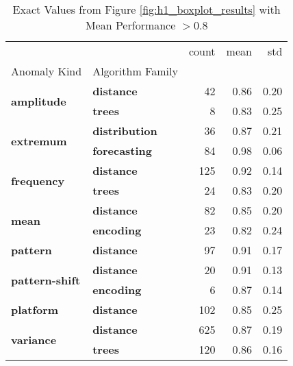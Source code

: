 \begin{table}
\centering
\caption{Exact Values from Figure \ref{fig:h1_boxplot_results} with Mean Performance $> 0.8$}
\label{tab:best-performer}
\begin{tabular}{llrrr}
\toprule
 &  & count & mean & std \\
Anomaly Kind & Algorithm Family &  &  &  \\
\midrule
\multirow[t]{2}{*}{\textbf{amplitude}} & \textbf{distance} & 42 & 0.86 & 0.20 \\
\textbf{} & \textbf{trees} & 8 & 0.83 & 0.25 \\
\cline{1-5}
\multirow[t]{2}{*}{\textbf{extremum}} & \textbf{distribution} & 36 & 0.87 & 0.21 \\
\textbf{} & \textbf{forecasting} & 84 & 0.98 & 0.06 \\
\cline{1-5}
\multirow[t]{2}{*}{\textbf{frequency}} & \textbf{distance} & 125 & 0.92 & 0.14 \\
\textbf{} & \textbf{trees} & 24 & 0.83 & 0.20 \\
\cline{1-5}
\multirow[t]{2}{*}{\textbf{mean}} & \textbf{distance} & 82 & 0.85 & 0.20 \\
\textbf{} & \textbf{encoding} & 23 & 0.82 & 0.24 \\
\cline{1-5}
\textbf{pattern} & \textbf{distance} & 97 & 0.91 & 0.17 \\
\cline{1-5}
\multirow[t]{2}{*}{\textbf{pattern-shift}} & \textbf{distance} & 20 & 0.91 & 0.13 \\
\textbf{} & \textbf{encoding} & 6 & 0.87 & 0.14 \\
\cline{1-5}
\textbf{platform} & \textbf{distance} & 102 & 0.85 & 0.25 \\
\cline{1-5}
\multirow[t]{2}{*}{\textbf{variance}} & \textbf{distance} & 625 & 0.87 & 0.19 \\
\textbf{} & \textbf{trees} & 120 & 0.86 & 0.16 \\
\cline{1-5}
\bottomrule
\end{tabular}
\end{table}
